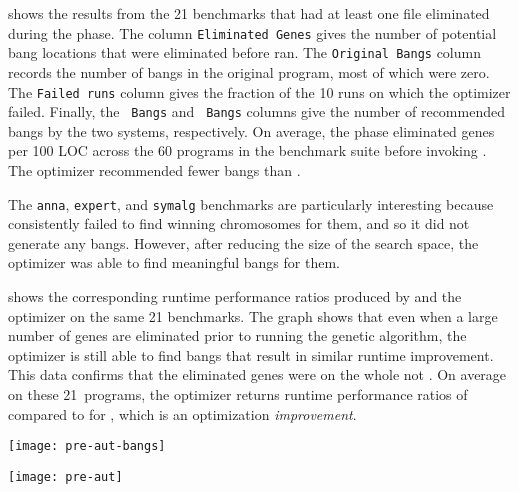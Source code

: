  shows the results from the 21 benchmarks that
had at least one file eliminated during the \preopt{} phase. The
column \texttt{Eliminated Genes} gives the number of potential bang
locations that were eliminated before \Ao{} ran.
The \texttt{Original Bangs} column records the number of bangs in the
original program, most of which were zero.
The \texttt{Failed runs} column gives the fraction of the 10 runs on
which the \Preopt{} optimizer failed.
Finally, the \texttt{\Ao{} Bangs} and \texttt{\Preopt{} Bangs} columns
give the number of recommended bangs by the two systems,
respectively.  On average, the \preopt{} phase eliminated
\preoptElim{} genes per 100 LOC across the 60 programs in the benchmark suite before
invoking \Ao{}.
The \Preopt{} optimizer recommended \preoptFewerBangs{} fewer bangs
than \Ao{}.

The \texttt{anna}, \texttt{expert}, and \texttt{symalg} benchmarks are
particularly interesting because \Ao{} consistently failed to find
winning chromosomes for them, and so it did not generate any bangs. However,
after reducing the size of the search space, the \Preopt{}
optimizer was able to find meaningful bangs for them.

 shows the corresponding runtime
performance ratios produced by \Ao{} and the \Preopt{} optimizer on
the same 21 benchmarks.
The graph shows that even when a large number of genes are
eliminated prior to running the genetic algorithm, the optimizer is still able to
find \useful{} bangs that result in similar runtime improvement. This data
confirms that the eliminated genes were on the whole not \useful{}.
On average on these 21~programs, the \Preopt{} optimizer returns
runtime performance ratios of \preoptPerformance{} compared
to \AoPerformance{} for \Ao, which is an
optimization \textit{improvement}.


\begin{figure*}
\texttt{[image: pre-aut-bangs]}
\label{fig:preopt-bangs}
\end{figure*}

\begin{figure*}
\texttt{[image: pre-aut]}
\label{fig:preopt-runtime}
\end{figure*}


